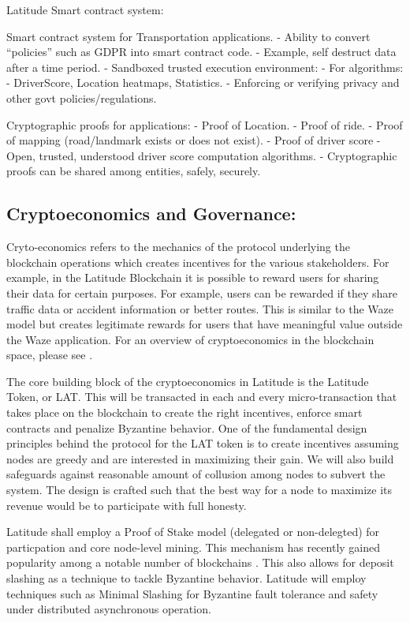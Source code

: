 \noindent
{\textsf Latitude Smart contract system:}

Smart contract system for Transportation applications.
 - Ability to convert “policies” such as GDPR into smart contract code.
 - Example, self destruct data after a time period.
 - Sandboxed trusted execution environment:
 - For algorithms:
   - DriverScore, Location heatmaps, Statistics.
   - Enforcing or verifying privacy and other govt policies/regulations.

Cryptographic proofs for applications:
 - Proof of Location. 
 - Proof of ride. 
 - Proof of mapping 
      (road/landmark exists or does not exist).
 - Proof of driver score 
 - Open, trusted, understood driver score computation algorithms.
 - Cryptographic proofs can be shared among entities, safely, securely.

\noindent
\subsection{Cryptoeconomics and Governance:}
Cryto-economics refers to the mechanics of the protocol underlying the blockchain operations which creates incentives
for the various stakeholders. For example, in the Latitude Blockchain it is possible to reward users for sharing their data
for certain purposes. For example, users can be rewarded if they share traffic data or accident information or better
routes. This is similar to the Waze model but creates legitimate rewards for users that have meaningful value outside
the Waze application. For an overview of cryptoeconomics in the blockchain space, please see \cite{sinclair_crypto}.

The core building block of the cryptoeconomics in Latitude is the Latitude Token, or LAT. This will be transacted in
each and every micro-transaction that takes place on the blockchain to create the right incentives, enforce smart
contracts and penalize Byzantine behavior. One of the fundamental design principles behind the protocol for the LAT
token is to create incentives assuming nodes are greedy and are interested in maximizing their gain. We will also build
safeguards against reasonable amount of collusion among nodes to subvert the system. The design is crafted such that the
best way for a node to maximize its revenue would be to participate with full honesty.

Latitude shall employ a Proof of Stake model (delegated or non-delegted) for particpation and core node-level mining. This mechanism has recently
gained popularity among a notable number of blockchains \cite{dpos_steemit}. This also allows for deposit slashing as a
technique to tackle Byzantine behavior. Latitude will employ techniques such as Minimal Slashing \cite{buterin_slashing}
for Byzantine fault tolerance and safety under distributed asynchronous operation.


